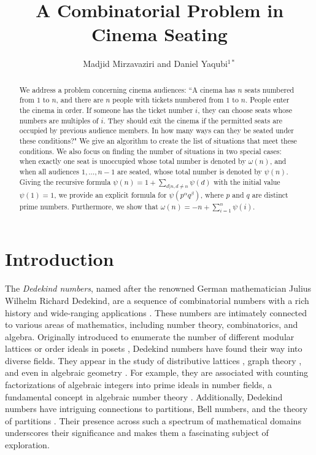 \documentclass{amsart}
\title{A Combinatorial Problem in Cinema Seating}
\author[M. Mirzavaziri and D. Yaqubi ]{Madjid Mirzavaziri and Daniel Yaqubi$^{1*}$ }
\theoremstyle{definition}
\begin{document}
\begin{abstract}
We address a problem concerning cinema audiences: ``A cinema has $n$ seats numbered from $1$ to $n$, and there are $n$ people with tickets numbered from $1$ to $n$. People enter the cinema in order. If someone has the ticket number $i$, they can choose seats whose numbers are multiples of $i$. They should exit the cinema if the permitted seats are occupied by previous audience members. In how many ways can they be seated under these conditions?" We give an algorithm to create the list of situations that meet these conditions. We also focus on finding the number of situations in two special cases: when exactly one seat is unoccupied whose total number is denoted by $\omega(n)$, and when all audiences $1, \ldots, n-1$ are seated, whose total number is denoted by $\psi(n)$. Giving the recursive formula $\psi(n)=1+\sum_{d|n, d\neq n}\psi(d)$ with the initial value $\psi(1)=1$, we provide an explicit formula for $\psi(p^\alpha q^\beta)$, where $p$ and $q$ are distinct prime numbers. Furthermore, we show that $\omega(n)=-n+\sum_{i=1}^n\psi(i)$.
\end{abstract}

\maketitle

\section{Introduction}

The \textit{Dedekind numbers}, named after the renowned German mathematician Julius Wilhelm Richard Dedekind, are a sequence of combinatorial numbers with a rich history and wide-ranging applications \cite{Dedekind1897, BermanKohler1976, Church1940, Kisielewicz1988, KleitmanMarkowsky1975, Wiedemann1991}. These numbers are intimately connected to various areas of mathematics, including number theory, combinatorics, and algebra. Originally introduced to enumerate the number of different modular lattices or order ideals in posets \cite{Dedekind1897}, Dedekind numbers have found their way into diverse fields. They appear in the study of distributive lattices \cite{BermanKohler1976}, graph theory \cite{Church1940}, and even in algebraic geometry \cite{Kisielewicz1988}. For example, they are associated with counting factorizations of algebraic integers into prime ideals in number fields, a fundamental concept in algebraic number theory \cite{KleitmanMarkowsky1975}. Additionally, Dedekind numbers have intriguing connections to partitions, Bell numbers, and the theory of partitions \cite{Kisielewicz1988, Korshunov1981, Zaguia1993}. Their presence across such a spectrum of mathematical domains underscores their significance and makes them a fascinating subject of exploration.
\end{document}
